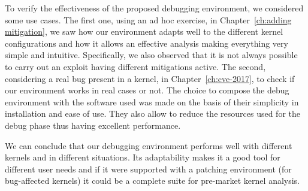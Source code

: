 \documentclass{masterthesis}
\newcommand{\refToChapter}[1]{Chapter~\ref{ch:#1}\xspace}
\begin{document}
To verify the effectiveness of the proposed debugging environment, we considered some use cases.
The first one, using an ad hoc exercise, in \refToChapter{adding mitigation}, we saw how our environment adapts well to the different kernel configurations and how it allows an effective analysis making everything very simple and intuitive.  Specifically, we also observed that it is not always possible to carry out an exploit having different mitigations active.
The second, considering a real bug present in a kernel, in \refToChapter{cve-2017}, to check if our environment works in real cases or not.
The choice to compose the debug environment with the software used was made on the basis of their simplicity in installation and ease of use.  They also allow to reduce the resources used for the debug phase thus having excellent performance.

We can conclude that our debugging environment performs well with different kernels and in different situations.  Its adaptability makes it a good tool for different user needs and if it were supported with a patching environment (for bug-affected kernels) it could be a complete suite for pre-market kernel analysis.




\end{document}

